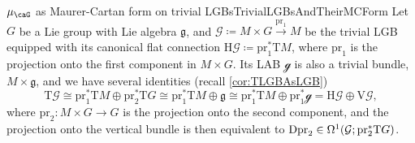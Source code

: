 \documentclass[reqno,a4paper,oneside]{amsart}
\newcommand\mutot{\mu_\caG}
\theoremstyle{plain}
\theoremstyle{remark}
\theoremstyle{definition}
\begin{document}
\begin{remarks}{$\mutot$ as Maurer-Cartan form on trivial LGBs}{TrivialLGBsAndTheirMCForm}
Let $G$ be a Lie group with Lie algebra $\mathfrak{g}$, and $\mathcal{G} \coloneqq M \times G \stackrel{\mathrm{pr}_1}{\to} M$ be the trivial LGB equipped with its canonical flat connection $\mathrm{H}\mathcal{G} \coloneqq \mathrm{pr}_1^*\mathrm{T}M$, where $\mathrm{pr}_1$ is the projection onto the first component in $M \times G$. Its LAB $\mathcal{g}$ is also a trivial bundle, $M \times \mathfrak{g}$, and we have several identities (recall \ref{cor:TLGBAsLGB})
\begin{equation*}
\mathrm{T}\mathcal{G}
\cong
\mathrm{pr}_1^*\mathrm{T}M \oplus \mathrm{pr}_2^*\mathrm{T}G
\cong
\mathrm{pr}_1^*\mathrm{T}M \oplus \mathfrak{g}
\cong
\mathrm{pr}_1^*\mathrm{T}M \oplus \mathrm{pr}_1^*\mathcal{g}
=
\mathrm{H}\mathcal{G} \oplus \mathrm{V}\mathcal{G},
\end{equation*}
where $\mathrm{pr}_2\colon M \times G \to G$ is the projection onto the second component,
and the projection onto the vertical bundle is then equivalent to $\mathrm{Dpr}_2 \in \Omega^1\mleft(\mathcal{G}; \mathrm{pr}_2^*\mathrm{T}G\mright)$. 


\end{remarks}
\end{document}
